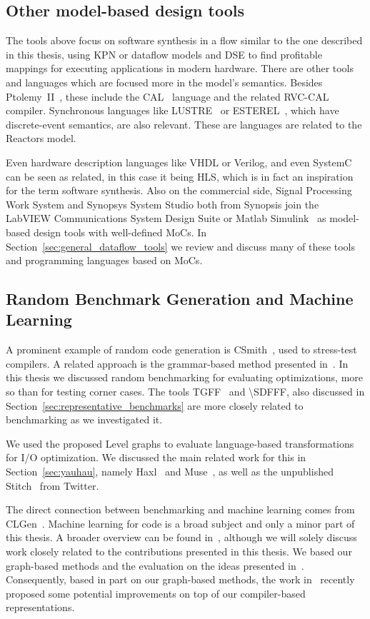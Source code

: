 \subsection{Other model-based design tools}

The tools above focus on software synthesis in a flow similar to the one described in this thesis, using \ac{KPN} or dataflow models and \ac{DSE} to find profitable mappings for executing applications in modern hardware.
There are other tools and languages which are focused more in the model's semantics. Besides Ptolemy~II~\cite{Ptolemaeus:14:SystemDesign}, these include the CAL~\cite{eker2003cal} language and the related \ac{RVC}-CAL compiler.
Synchronous languages like LUSTRE~\cite{lustre} or ESTEREL~\cite{esterel}, which have discrete-event semantics, are also relevant. These are languages are related to the Reactors model.

Even hardware description languages like VHDL or Verilog, and even SystemC~\cite{semantics_systemc} can be seen as related, in this case it being \ac{HLS}, which is in fact an inspiration for the term software synthesis.
Also on the commercial side, Signal Processing Work System and Synopsys System Studio both from Synopsis join the LabVIEW Communications System Design Suite or Matlab Simulink~\cite{klikpo2016modeling} as model-based design tools with well-defined \acp{MoC}.
In Section~\ref{sec:general_dataflow_tools} we review and discuss many of these tools and programming languages based on \acp{MoC}.


\subsection{Random Benchmark Generation and Machine Learning}

A prominent example of random code generation is CSmith~\cite{csmith}, used to stress-test compilers.
A related approach is the grammar-based method presented in~\cite{mckenzie1997generating}.
In this thesis we discussed random benchmarking for evaluating optimizations, more so than for testing corner cases.
The tools \ac{TGFF}~\cite{dick1998tgff} and \ac{\SDFFF}\cite{sdf3}, also discussed in Section~\ref{sec:representative_benchmarks} are more closely related to benchmarking as we investigated it.

We used the proposed Level graphs to evaluate language-based transformations for \ac{I/O} optimization.
We discussed the main related work for this in Section~\ref{sec:yauhau}, namely Haxl~\cite{marlow2014haxl} and Muse~\cite{muse}, as well as the unpublished Stitch~\cite{stitch} from Twitter.

The direct connection between benchmarking and machine learning comes from CLGen~\cite{cummins_cgo2017}.
Machine learning for code is a broad subject and only a minor part of this thesis.
A broader overview can be found in~\cite{allamanis2018survey}, although we will solely discuss work closely related to the contributions presented in this thesis. 
We based our graph-based methods and the evaluation on the ideas presented in~\cite{cummins_pact17,inst2vec}.
Consequently, based in part on our graph-based methods, the work in~\cite{cummins_programl,ye2020deep} recently proposed some potential improvements on top of our compiler-based representations.